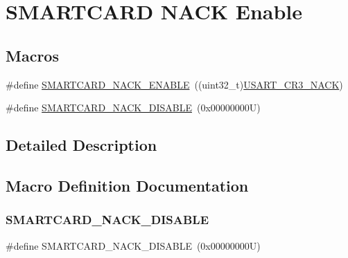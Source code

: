\hypertarget{group___s_m_a_r_t_c_a_r_d___n_a_c_k___enable}{}\section{S\+M\+A\+R\+T\+C\+A\+RD N\+A\+CK Enable}
\label{group___s_m_a_r_t_c_a_r_d___n_a_c_k___enable}
\subsection*{Macros}
\begin{DoxyCompactItemize}
\item 
\#define \hyperlink{group___s_m_a_r_t_c_a_r_d___n_a_c_k___enable_ga83d350ff558fc372bc2efc5b5a477147}{S\+M\+A\+R\+T\+C\+A\+R\+D\+\_\+\+N\+A\+C\+K\+\_\+\+E\+N\+A\+B\+LE}~((uint32\+\_\+t)\hyperlink{group___peripheral___registers___bits___definition_ga3f3b70b2ee9ff0b59e952fd7ab04373c}{U\+S\+A\+R\+T\+\_\+\+C\+R3\+\_\+\+N\+A\+CK})
\item 
\#define \hyperlink{group___s_m_a_r_t_c_a_r_d___n_a_c_k___enable_ga746a79736cf7c2f8478b6c00f7908eda}{S\+M\+A\+R\+T\+C\+A\+R\+D\+\_\+\+N\+A\+C\+K\+\_\+\+D\+I\+S\+A\+B\+LE}~(0x00000000\+U)
\end{DoxyCompactItemize}


\subsection{Detailed Description}


\subsection{Macro Definition Documentation}
\mbox{\label{group___s_m_a_r_t_c_a_r_d___n_a_c_k___enable_ga746a79736cf7c2f8478b6c00f7908eda}} 
\subsubsection{\texorpdfstring{S\+M\+A\+R\+T\+C\+A\+R\+D\+\_\+\+N\+A\+C\+K\+\_\+\+D\+I\+S\+A\+B\+LE}{SMARTCARD\_NACK\_DISABLE}}
{\footnotesize\ttfamily \#define S\+M\+A\+R\+T\+C\+A\+R\+D\+\_\+\+N\+A\+C\+K\+\_\+\+D\+I\+S\+A\+B\+LE~(0x00000000\+U)}

